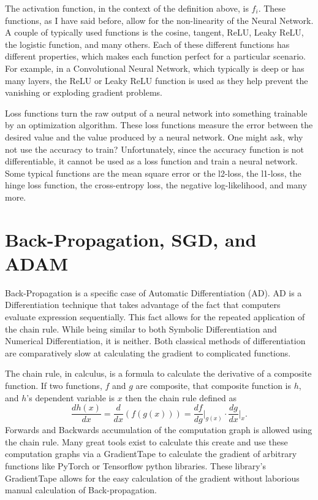 The activation function, in the context of the definition above, is $f_i$. These functions, as I have said before, allow for the non-linearity of the Neural Network. A couple of typically used functions is the cosine, tangent, ReLU, Leaky ReLU, the logistic function, and many others. Each of these different functions has different properties, which makes each function perfect for a particular scenario. For example, in a Convolutional Neural Network, which typically is deep or has many layers, the ReLU or Leaky ReLU function is used as they help prevent the vanishing or exploding gradient problems.

Loss functions turn the raw output of a neural network into something trainable by an optimization algorithm. These loss functions measure the error between the desired value and the value produced by a neural network. One might ask, why not use the accuracy to train? Unfortunately, since the accuracy function is not differentiable, it cannot be used as a loss function and train a neural network. Some typical functions are the mean square error or the l2-loss, the l1-loss, the hinge loss function, the cross-entropy loss, the negative log-likelihood, and many more.

\section{Back-Propagation, SGD, and ADAM}

Back-Propagation is a specific case of Automatic Differentiation (AD). AD is a Differentiation technique that takes advantage of the fact that computers evaluate expression sequentially. This fact allows for the repeated application of the chain rule. While being similar to both Symbolic Differentiation and Numerical Differentiation, it is neither. Both classical methods of differentiation are comparatively slow at calculating the gradient to complicated functions. 

The chain rule, in calculus, is a formula to calculate the derivative of a composite function. If two functions, $f$ and $g$ are composite, that composite function is $h$, and $h$'s dependent variable is $x$ then the chain rule defined as 
$$\frac{dh(x)}{dx}=\frac{d}{dx}(f(g(x)))=\frac{df}{dg}\bigg|_{g(x)}\cdot\frac{dg}{dx}\bigg|_{x}.$$ Forwards and Backwards accumulation of the computation graph is allowed using the chain rule. Many great tools exist to calculate this create and use these computation graphs via a GradientTape to calculate the gradient of arbitrary functions like PyTorch or Tensorflow python libraries. These library's GradientTape allows for the easy calculation of the gradient without laborious manual calculation of Back-propagation.


